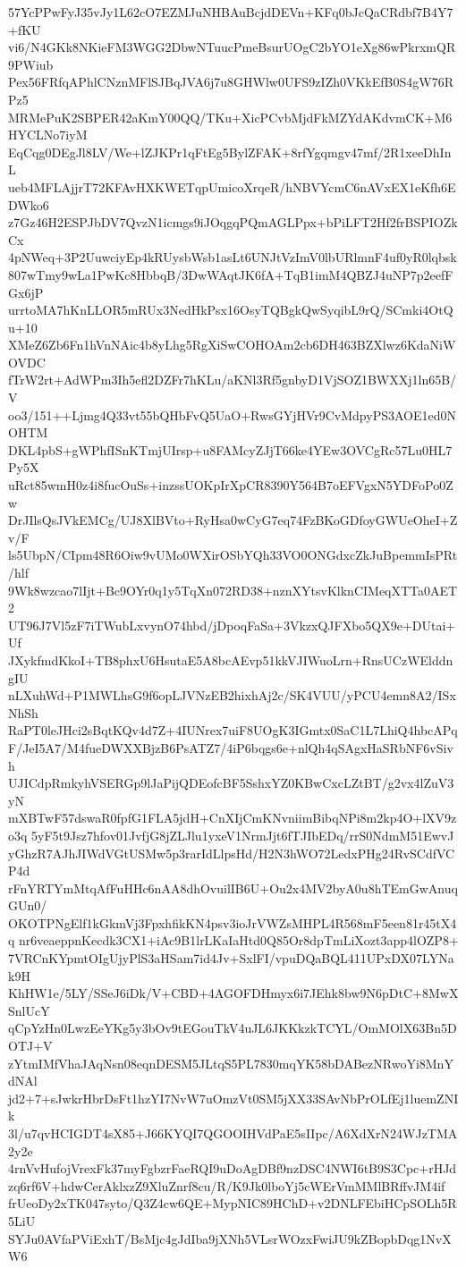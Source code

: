 57YcPPwFyJ35vJy1L62cO7EZMJuNHBAuBcjdDEVn+KFq0bJcQaCRdbf7B4Y7+fKU
vi6/N4GKk8NKieFM3WGG2DbwNTuucPmeBsurUOgC2bYO1eXg86wPkrxmQR9PWiub
Pex56FRfqAPhlCNznMFlSJBqJVA6j7u8GHWlw0UFS9zIZh0VKkEfB0S4gW76RPz5
MRMePuK2SBPER42aKmY00QQ/TKu+XicPCvbMjdFkMZYdAKdvmCK+M6HYCLNo7iyM
EqCqg0DEgJl8LV/We+lZJKPr1qFtEg5BylZFAK+8rfYgqmgv47mf/2R1xeeDhInL
ueb4MFLAjjrT72KFAvHXKWETqpUmicoXrqeR/hNBVYcmC6nAVxEX1eKfh6EDWko6
z7Gz46H2ESPJbDV7QvzN1icmgs9iJOqgqPQmAGLPpx+bPiLFT2Hf2frBSPIOZkCx
4pNWeq+3P2UuwciyEp4kRUysbWsb1asLt6UNJtVzImV0lbURlmnF4uf0yR0lqbsk
807wTmy9wLa1PwKc8HbbqB/3DwWAqtJK6fA+TqB1imM4QBZJ4uNP7p2eefFGx6jP
urrtoMA7hKnLLOR5mRUx3NedHkPsx16OsyTQBgkQwSyqibL9rQ/SCmki4OtQu+10
XMeZ6Zb6Fn1hVnNAic4b8yLhg5RgXiSwCOHOAm2cb6DH463BZXlwz6KdaNiWOVDC
fTrW2rt+AdWPm3Ih5efl2DZFr7hKLu/aKNl3Rf5gnbyD1VjSOZ1BWXXj1ln65B/V
oo3/151++Ljmg4Q33vt55bQHbFvQ5UaO+RwsGYjHVr9CvMdpyPS3AOE1ed0NOHTM
DKL4pbS+gWPhfISnKTmjUIrsp+u8FAMcyZJjT66ke4YEw3OVCgRc57Lu0HL7Py5X
uRct85wmH0z4i8fucOuSs+inzssUOKpIrXpCR8390Y564B7oEFVgxN5YDFoPo0Zw
DrJIlsQsJVkEMCg/UJ8XlBVto+RyHsa0wCyG7eq74FzBKoGDfoyGWUeOheI+Zv/F
ls5UbpN/CIpm48R6Oiw9vUMo0WXirOSbYQh33VO0ONGdxcZkJuBpemmIsPRt/hlf
9Wk8wzcao7lIjt+Bc9OYr0q1y5TqXn072RD38+nznXYtsvKlknCIMeqXTTa0AET2
UT96J7Vl5zF7iTWubLxvynO74hbd/jDpoqFaSa+3VkzxQJFXbo5QX9e+DUtai+Uf
JXykfmdKkoI+TB8phxU6HsutaE5A8bcAEvp51kkVJIWuoLrn+RnsUCzWElddngIU
nLXuhWd+P1MWLhsG9f6opLJVNzEB2hixhAj2c/SK4VUU/yPCU4emn8A2/ISxNhSh
RaPT0leJHci2sBqtKQv4d7Z+4IUNrex7uiF8UOgK3IGmtx0SaC1L7LhiQ4hbcAPq
F/JeI5A7/M4fueDWXXBjzB6PsATZ7/4iP6bqgs6e+nlQh4qSAgxHaSRbNF6vSivh
UJICdpRmkyhVSERGp9lJaPijQDEofcBF5SshxYZ0KBwCxcLZtBT/g2vx4lZuV3yN
mXBTwF57dswaR0fpfG1FLA5jdH+CnXIjCmKNvniimBibqNPi8m2kp4O+lXV9zo3q
5yF5t9Jsz7hfov01JvfjG8jZLJlu1yxeV1NrmJjt6fTJIbEDq/rrS0NdmM51EwvJ
yGhzR7AJhJIWdVGtUSMw5p3rarIdLlpsHd/H2N3hWO72LedxPHg24RvSCdfVCP4d
rFnYRTYmMtqAfFuHHc6nAA8dhOvuilIB6U+Ou2x4MV2byA0u8hTEmGwAnuqGUn0/
OKOTPNgElf1kGkmVj3FpxhfikKN4psv3ioJrVWZsMHPL4R568mF5een81r45tX4q
nr6veaeppnKecdk3CX1+iAc9B1lrLKaIaHtd0Q85Or8dpTmLiXozt3app4lOZP8+
7VRCnKYpmtOIgUjyPlS3aHSam7id4Jv+SxlFI/vpuDQaBQL411UPxDX07LYNak9H
KhHW1e/5LY/SSeJ6iDk/V+CBD+4AGOFDHmyx6i7JEhk8bw9N6pDtC+8MwXSnlUcY
qCpYzHn0LwzEeYKg5y3bOv9tEGouTkV4uJL6JKKkzkTCYL/OmMOlX63Bn5DOTJ+V
zYtmIMfVhaJAqNsn08eqnDESM5JLtqS5PL7830mqYK58bDABezNRwoYi8MnYdNAl
jd2+7+sJwkrHbrDsFt1hzYI7NvW7uOmzVt0SM5jXX33SAvNbPrOLfEj1luemZNIk
3l/u7qvHCIGDT4sX85+J66KYQI7QGOOIHVdPaE5sIIpc/A6XdXrN24WJzTMA2y2e
4rnVvHufojVrexFk37myFgbzrFaeRQI9uDoAgDBf9nzDSC4NWI6tB9S3Cpc+rHJd
zq6rf6V+hdwCerAklxzZ9XluZnrf8cu/R/K9Jk0lboYj5cWErVmMMlBRffvJM4if
frUeoDy2xTK047syto/Q3Z4cw6QE+MypNIC89HChD+v2DNLFEbiHCpSOLh5R5LiU
SYJu0AVfaPViExhT/BsMjc4gJdIba9jXNh5VLsrWOzxFwiJU9kZBopbDqg1NvXW6

